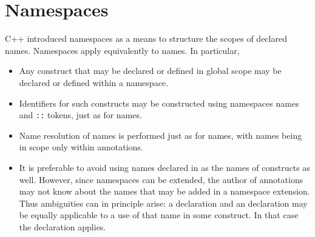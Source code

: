 \section{Namespaces}
\label{sec:namespaces}

C++ introduced namespaces as a means to structure the scopes of declared names. Namespaces apply equivalently to \NAME{} 
names. In particular,
\begin{itemize}
\item Any \NAME{} construct that may be declared or defined 
in global scope may be declared or defined within a namespace.
\item Identifiers for such constructs may be constructed using namespaces names and \lstinline|::| tokens, just as for \lang{} names.
\item Name resolution of \NAME{} names is performed just as for \lang{} names, with \NAME{} names being in scope only within \NAME{} annotations.
\item It is preferable to avoid using names declared in \lang{} as the names of \NAME{} constructs as well. However, since namespaces can be extended, the author of \NAME{} annotations may not know about the \lang{} names that may be added in a namespace extension. Thus ambiguities can in
principle arise: a \lang{} declaration and an \NAME{}
declaration may be equally applicable to a use of that name 
in some \NAME{} construct. In that case the \NAME{} declaration applies.

\end{itemize}
